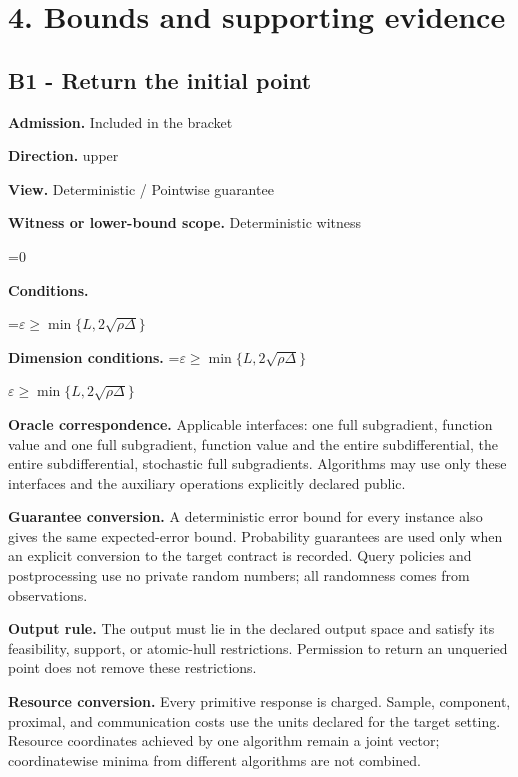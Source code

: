 \documentclass[10pt,a4paper]{article}
\newcommand{\AtlasMath}[1]{\par\begingroup\centering\setbox0=\hbox{$\displaystyle #1$}\ifdim\wd0>1.4\linewidth\typeout{ATLAS WIDE FORMULA: \the\wd0}\fi\ifdim\wd0>\linewidth\resizebox{\linewidth}{!}{\box0}\else\box0\fi\par\endgroup}
\newcommand{\AtlasInlineMath}[1]{\begingroup\setbox0=\hbox{$#1$}\ifdim\wd0>.4\linewidth\endgroup\AtlasMath{#1}\else\endgroup$#1$\fi}
\begin{document}
\section{4. Bounds and supporting evidence}


\subsection{B1 - Return the initial point}


\textbf{Admission.} Included in the bracket



\textbf{Direction.} upper



\textbf{View.} Deterministic / Pointwise guarantee



\textbf{Witness or lower-bound scope.} Deterministic witness



\AtlasMath{0}


\textbf{Conditions.}
\AtlasMath{\varepsilon\ge\min\{L,2\sqrt{\rho\Delta}\}}




\textbf{Dimension conditions.} \AtlasInlineMath{\varepsilon\ge\min\{L,2\sqrt{\rho\Delta}\}}



\textbf{Oracle correspondence.} Applicable interfaces: one full subgradient, function value and one full subgradient, function value and the entire subdifferential, the entire subdifferential, stochastic full subgradients. Algorithms may use only these interfaces and the auxiliary operations explicitly declared public.



\textbf{Guarantee conversion.} A deterministic error bound for every instance also gives the same expected-error bound. Probability guarantees are used only when an explicit conversion to the target contract is recorded. Query policies and postprocessing use no private random numbers; all randomness comes from observations.



\textbf{Output rule.} The output must lie in the declared output space and satisfy its feasibility, support, or atomic-hull restrictions. Permission to return an unqueried point does not remove these restrictions.



\textbf{Resource conversion.} Every primitive response is charged. Sample, component, proximal, and communication costs use the units declared for the target setting. Resource coordinates achieved by one algorithm remain a joint vector; coordinatewise minima from different algorithms are not combined.
\end{document}

